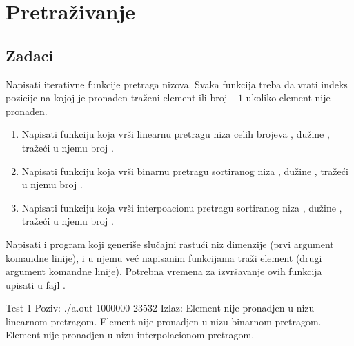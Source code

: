 
\chapter{Pretraživanje}

\section{Zadaci}

\begin{Exercise}[label=401]
  Napisati iterativne funkcije pretraga nizova. Svaka funkcija treba
  da vrati indeks pozicije na kojoj je pronađen traženi element ili
  broj $-1$ ukoliko element nije pronađen.
  \begin{enumerate}  
  \item Napisati funkciju koja vrši linearnu pretragu niza 
    celih brojeva , dužine , tražeći u njemu broj
    .  
  \item Napisati funkciju koja vrši binarnu pretragu
    sortiranog niza , dužine , tražeći u njemu broj .
  \item Napisati funkciju koja vrši interpoacionu pretragu
    sortiranog niza , dužine , tražeći u njemu broj .
  \end{enumerate}
  Napisati i program koji generiše slučajni rastući niz dimenzije
   (prvi argument komandne linije), i u njemu već napisanim
  funkcijama traži element  (drugi argument komandne
  linije). Potrebna vremena za izvršavanje ovih funkcija upisati u
  fajl .
  
\begin{maxitest}
\begin{test}{Test 1}
Poziv: ./a.out 1000000 23532
Izlaz: Element nije pronadjen u nizu linearnom pretragom.
       Element nije pronadjen u nizu binarnom pretragom.
       Element nije pronadjen u nizu interpolacionom pretragom.  
\end{test}
\end{maxitest}
  
\end{Exercise}

\begin{Answer}[ref=401]
\end{Answer}

